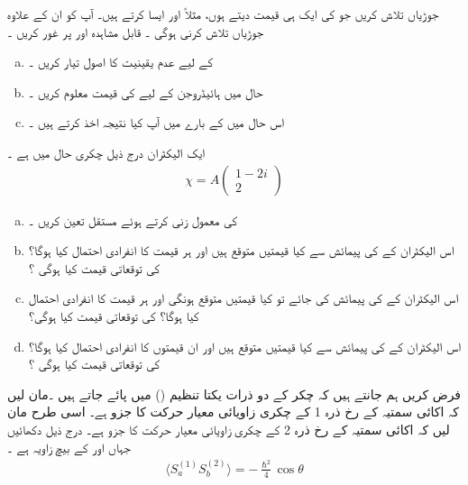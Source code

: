   جوڑیاں  تلاش کریں جو  کی ایک ہی قیمت دیتے ہوں،  مثلاً   اور  ایسا کرتے ہیں۔ آپ کو ان کے علاوہ جوڑیاں تلاش کرنی ہوگی ۔
قابل مشاہدہ   اور  پر غور کریں ۔
\begin{enumerate}[a.]
\item
{} کے لیے عدم یقینیت کا اصول تیار کریں ۔
\item
حال  میں ہائیڈروجن کے لیے  کی قیمت معلوم کریں ۔
\item
اس حال میں  کے بارے میں آپ کیا نتیجہ اخذ کرتے ہیں ۔
\end{enumerate}
ایک الیکٹران درج ذیل چکری حال میں ہے ۔
\begin{align*}
\chi = A
\begin{pmatrix}
1 - 2i \\
2
\end{pmatrix}
\end{align*}
\begin{enumerate}[a.]
\item
{} کی معمول زنی کرتے   ہوئے مستقل  تعین کریں ۔
\item
اس الیکٹران کے   کی پیمائش سے کیا قیمتیں متوقع ہیں اور ہر قیمت کا انفرادی احتمال کیا ہوگا؟   کی توقعاتی قیمت کیا ہوگی ؟
\item
 اس الیکٹران کے  کی پیمائش کی جائے تو کیا  قیمتیں  متوقع ہونگی اور ہر قیمت کا انفرادی احتمال کیا ہوگا؟  کی توقعاتی قیمت کیا ہوگی؟ 
\item
اس الیکٹران کے   کی پیمائش سے کیا  قیمتیں  متوقع ہیں اور ان قیمتوں کا انفرادی احتمال کیا ہوگا؟   کی توقعاتی قیمت کیا ہوگی ؟
\end{enumerate}
فرض کریں  ہم جانتے ہیں کہ   چکر کے دو  ذرات یکتا تنظیم   () میں پائے جاتے ہیں ۔مان لیں کہ اکائی سمتیہ    کے رخ ذرہ 1 کے چکری زاویائی معیار حرکت کا جزو   ہے۔ اسی طرح مان لیں کہ اکائی سمتیہ    کے رخ ذرہ 2 کے چکری زاویائی معیار حرکت کا جزو   ہے۔ درج ذیل دکھائیں جہاں  اور  کے بیچ زاویہ  ہے ۔
\begin{align}
    \langle S_{a}^{(1)}S_{b}^{(2)}\rangle=-\frac{\hslash^{2}}{4}\cos\theta
\end{align}
